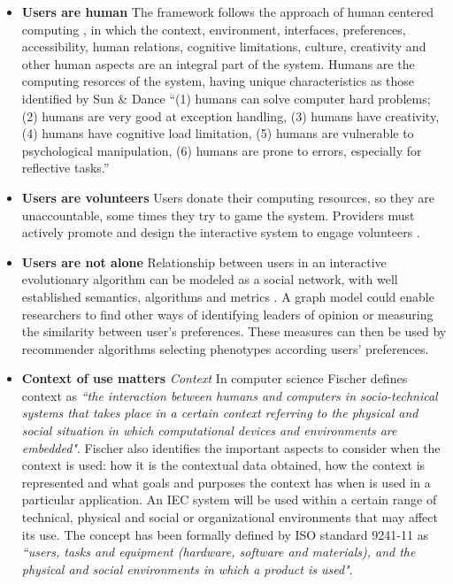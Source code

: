 \begin{itemize}
\item {\bf Users are human} 
  The framework follows the approach of human centered computing \cite{sebe2010human},
  in which the context, environment, interfaces, preferences, accessibility, human relations, cognitive
  limitations, culture, creativity and other human aspects are an integral part of the system.
  Humans are the computing resorces of the system, having unique characteristics as those identified by 
  Sun \& Dance \cite{Sun2013}  ``(1) humans can solve computer hard problems; (2) humans are very good at exception handling, (3) humans have creativity, (4) humans have cognitive load limitation, (5) humans are vulnerable to 
  psychological manipulation, (6) humans are prone to errors, especially for reflective tasks.''


\item {\bf Users are volunteers} Users donate their computing resources, so they are unaccountable, 
  some times they try to game the system. Providers must actively promote and design the interactive
  system to engage volunteers \cite{oh2015clicking}. 

\item {\bf Users are not alone}
  Relationship between users in an interactive evolutionary algorithm can be modeled
  as a social network, with well established semantics, algorithms and metrics \cite{ahuja1993network}.
  A graph model could enable researchers to find other ways of identifying leaders of 
  opinion or measuring the similarity between user's preferences. 
  These measures can then be used by recommender algorithms selecting 
  phenotypes according users' preferences. 

\item {\bf Context of use matters}
  \textit{Context} In computer science Fischer \cite{fischer2012context}
  defines context as \textit{``the interaction between humans and
  computers in socio-technical systems that takes place in a certain
  context referring to the physical and social situation in which
  computational devices and environments are embedded"}. 
  Fischer also identifies the important aspects to consider when the context is used: how it is
  the contextual data obtained, how the context is represented and what
  goals and purposes the context has when is used in a particular
  application.   An IEC system will  be used within a certain range of technical, physical and social or
  organizational environments \cite{maguire2001context} that may affect its use.
  The concept has been formally defined
  by ISO standard 9241-11 \cite{international1998iso} as \textit{``users,
  tasks and equipment (hardware, software and materials), and the
  physical and social environments in which a product is used"}.  


\end{itemize}
